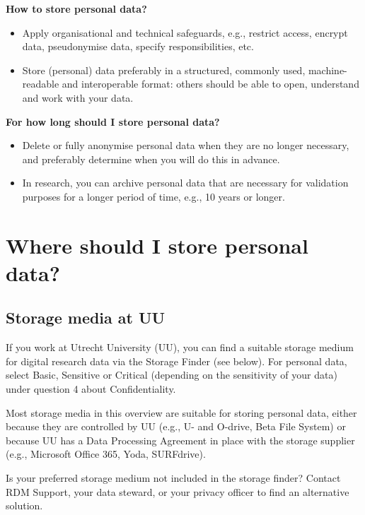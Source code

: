 \documentclass[
]{book}
\providecommand{\tightlist}{%
  \setlength{\itemsep}{0pt}\setlength{\parskip}{0pt}}
\begin{document}
\textbf{How to store personal data?}

\begin{itemize}
\tightlist
\item
  Apply organisational and technical safeguards,
  e.g., restrict access, encrypt data, pseudonymise data, specify responsibilities, etc.
\item
  Store (personal) data preferably in a structured, commonly used, machine-readable
  and interoperable format: others should be able to open, understand and work
  with your data.
\end{itemize}

\textbf{For how long should I store personal data?}

\begin{itemize}
\tightlist
\item
  Delete or fully anonymise personal data when they are no longer necessary,
  and preferably determine when you will do this in advance.
\item
  In research, you can archive personal data that are necessary for validation
  purposes for a longer period of time, e.g., 10 years or longer.
\end{itemize}

\hypertarget{data-storage-where}{%
\section{Where should I store personal data?}\label{data-storage-where}}

\hypertarget{storage-media-at-uu}{%
\subsection{Storage media at UU}\label{storage-media-at-uu}}

If you work at Utrecht University (UU), you can find a suitable storage medium for
digital research data via the Storage Finder (see below). For personal data, select Basic,
Sensitive or Critical (depending on the sensitivity of your data) under question
4 about Confidentiality.

Most storage media in this overview are suitable for storing personal data, either
because they are controlled by UU (e.g., U- and O-drive, Beta File System) or
because UU has a Data Processing Agreement in place with the storage supplier
(e.g., Microsoft Office 365, Yoda, SURFdrive).

Is your preferred storage medium not included in the storage finder? Contact
RDM Support, your data steward, or your
privacy officer to find an alternative solution.
\end{document}
